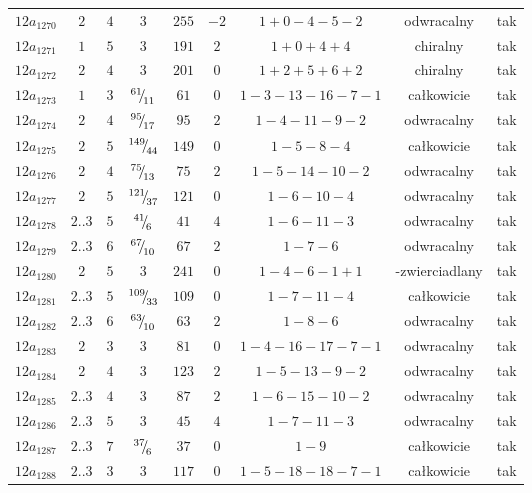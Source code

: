 \begin{longtable}{ccccccccc}
$12a_{1270}$ & $2$ & $4$ & $3$ & $255$ & $-2$ & $1+0-4-5-2$ & odwracalny & tak \\
$12a_{1271}$ & $1$ & $5$ & $3$ & $191$ & $2$ & $1+0+4+4$ & chiralny & tak \\
$12a_{1272}$ & $2$ & $4$ & $3$ & $201$ & $0$ & $1+2+5+6+2$ & chiralny & tak \\
$12a_{1273}$ & $1$ & $3$ & ${}^{61}{\mskip -5mu/\mskip -3mu}_{11}$ & $61$ & $0$ & $1-3-13-16-7-1$ & całkowicie & tak \\
$12a_{1274}$ & $2$ & $4$ & ${}^{95}{\mskip -5mu/\mskip -3mu}_{17}$ & $95$ & $2$ & $1-4-11-9-2$ & odwracalny & tak \\
$12a_{1275}$ & $2$ & $5$ & ${}^{149}{\mskip -5mu/\mskip -3mu}_{44}$ & $149$ & $0$ & $1-5-8-4$ & całkowicie & tak \\
$12a_{1276}$ & $2$ & $4$ & ${}^{75}{\mskip -5mu/\mskip -3mu}_{13}$ & $75$ & $2$ & $1-5-14-10-2$ & odwracalny & tak \\
$12a_{1277}$ & $2$ & $5$ & ${}^{121}{\mskip -5mu/\mskip -3mu}_{37}$ & $121$ & $0$ & $1-6-10-4$ & odwracalny & tak \\
$12a_{1278}$ & $2..3$ & $5$ & ${}^{41}{\mskip -5mu/\mskip -3mu}_{6}$ & $41$ & $4$ & $1-6-11-3$ & odwracalny & tak \\
$12a_{1279}$ & $2..3$ & $6$ & ${}^{67}{\mskip -5mu/\mskip -3mu}_{10}$ & $67$ & $2$ & $1-7-6$ & odwracalny & tak \\
$12a_{1280}$ & $2$ & $5$ & $3$ & $241$ & $0$ & $1-4-6-1+1$ & -zwierciadlany & tak \\
$12a_{1281}$ & $2..3$ & $5$ & ${}^{109}{\mskip -5mu/\mskip -3mu}_{33}$ & $109$ & $0$ & $1-7-11-4$ & całkowicie & tak \\
$12a_{1282}$ & $2..3$ & $6$ & ${}^{63}{\mskip -5mu/\mskip -3mu}_{10}$ & $63$ & $2$ & $1-8-6$ & odwracalny & tak \\
$12a_{1283}$ & $2$ & $3$ & $3$ & $81$ & $0$ & $1-4-16-17-7-1$ & odwracalny & tak \\
$12a_{1284}$ & $2$ & $4$ & $3$ & $123$ & $2$ & $1-5-13-9-2$ & odwracalny & tak \\
$12a_{1285}$ & $2..3$ & $4$ & $3$ & $87$ & $2$ & $1-6-15-10-2$ & odwracalny & tak \\
$12a_{1286}$ & $2..3$ & $5$ & $3$ & $45$ & $4$ & $1-7-11-3$ & odwracalny & tak \\
$12a_{1287}$ & $2..3$ & $7$ & ${}^{37}{\mskip -5mu/\mskip -3mu}_{6}$ & $37$ & $0$ & $1-9$ & całkowicie & tak \\
$12a_{1288}$ & $2..3$ & $3$ & $3$ & $117$ & $0$ & $1-5-18-18-7-1$ & całkowicie & tak \\

\end{longtable}
